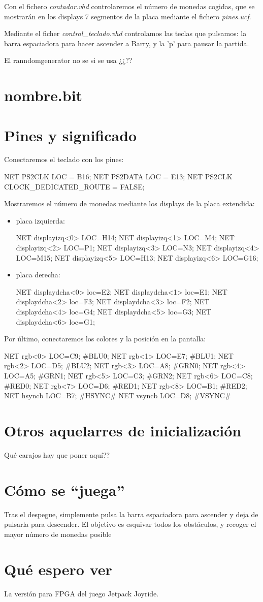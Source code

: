 \documentclass[11pt, a4paper, spanish, openright, twoside]{book}
\begin{document}
Con el fichero \textit{contador.vhd} controlaremos el número de monedas cogidas, que se mostrarán en los displays 7 segmentos de la placa mediante el fichero \textit{pines.ucf}.

Mediante el ficher \textit{control_teclado.vhd} controlamos las teclas que pulsamos: la barra espaciadora para hacer ascender a Barry, y la 'p' para pausar la partida.

El ranndomgenerator no se si se usa ¿¿??


\section{nombre.bit}


\section{Pines y significado}
Conectaremos el teclado con los pines:

NET PS2CLK LOC = B16;
NET PS2DATA LOC = E13;
NET PS2CLK CLOCK_DEDICATED_ROUTE = FALSE;

Mostraremos el número de monedas mediante los displays de la placa extendida:
\begin{itemize}
\item placa izquierda:

NET displayizq<0> LOC=H14;
NET displayizq<1> LOC=M4;
NET displayizq<2> LOC=P1;
NET displayizq<3> LOC=N3;
NET displayizq<4> LOC=M15;
NET displayizq<5> LOC=H13;
NET displayizq<6> LOC=G16;

\item placa derecha:

NET displaydcha<0> loc=E2;
NET displaydcha<1> loc=E1;
NET displaydcha<2> loc=F3;
NET displaydcha<3> loc=F2;
NET displaydcha<4> loc=G4;
NET displaydcha<5> loc=G3;
NET displaydcha<6> loc=G1;
\end{itemize}

Por último, conectaremos los colores y la posición en la pantalla:

NET rgb<0> LOC=C9; #BLU0;
NET rgb<1> LOC=E7; #BLU1;
NET rgb<2> LOC=D5; #BLU2;
NET rgb<3> LOC=A8; #GRN0; 
NET rgb<4> LOC=A5; #GRN1;
NET rgb<5> LOC=C3; #GRN2;
NET rgb<6> LOC=C8; #RED0;
NET rgb<7> LOC=D6; #RED1;
NET rgb<8> LOC=B1; #RED2;
NET hsyncb LOC=B7; #HSYNC# 
NET vsyncb LOC=D8; #VSYNC# 

\section{Otros aquelarres de inicialización}
Qué carajos hay que poner aquí??


\section{Cómo se ``juega''}
Tras el despegue, simplemente pulsa la barra espaciadora para ascender y deja de pulsarla para descender. El objetivo es esquivar todos los obstáculos, y recoger el mayor número de monedas posible


\section{Qué espero ver}
La versión para FPGA del juego Jetpack Joyride. 
\end{document}
